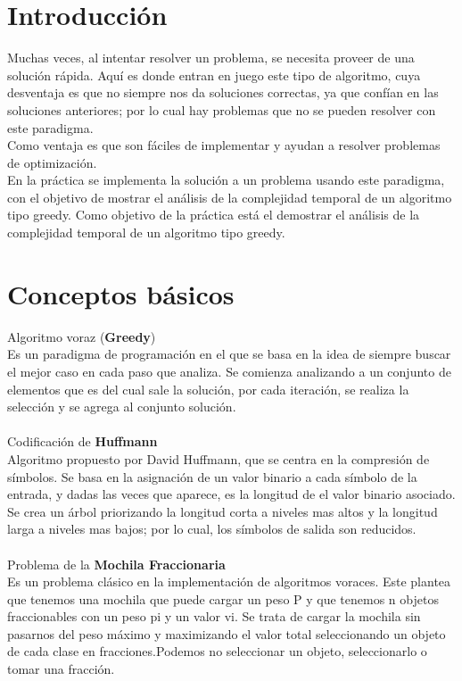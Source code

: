 \documentclass{article}
\begin{document}
\section{Introducción}
   Muchas veces, al intentar resolver un problema, se necesita proveer de una solución rápida. Aquí es donde entran en juego este tipo de algoritmo, cuya desventaja es que no siempre nos da soluciones correctas, ya que confían en las soluciones anteriores; por lo cual hay problemas que no se pueden resolver con este paradigma.\\
   Como ventaja es que son fáciles de implementar y ayudan a resolver problemas de optimización.  \\
   En la práctica se implementa la solución a un problema usando este paradigma, con el objetivo de mostrar el análisis de la complejidad temporal de un algoritmo tipo greedy.
    Como objetivo de la práctica está el demostrar el análisis de la complejidad temporal de un algoritmo tipo greedy.\cite{1}
\section{Conceptos básicos}
    Algoritmo voraz (\textbf{Greedy})\\
    Es un paradigma de programación en el que se basa en la idea de siempre buscar el mejor caso en cada paso que analiza. 
    Se comienza analizando a un conjunto de elementos que es del cual sale la solución,  por cada iteración, se realiza la selección y se agrega al conjunto solución.\cite{2}\\
    \\
    Codificación de \textbf{Huffmann}\\
    Algoritmo propuesto por David Huffmann, que se centra en la compresión de símbolos. Se basa en la asignación de un valor binario a cada símbolo de la entrada, y dadas las veces que aparece, es la longitud de el valor binario asociado. Se crea un árbol priorizando la longitud corta a niveles mas altos y la longitud larga a niveles mas bajos; por lo cual, los símbolos de salida son reducidos.\cite{3}\\
    \\
    Problema de la \textbf{Mochila Fraccionaria}\\
    Es un problema clásico en la implementación de algoritmos voraces. Este plantea que tenemos una mochila que puede cargar un peso  P y que tenemos n objetos fraccionables con un peso pi y un valor vi. Se trata de cargar la mochila sin pasarnos del peso máximo y maximizando el valor total seleccionando un objeto de cada clase en fracciones.Podemos no seleccionar un objeto, seleccionarlo o tomar una fracción.\cite{4}
    
\end{document}
